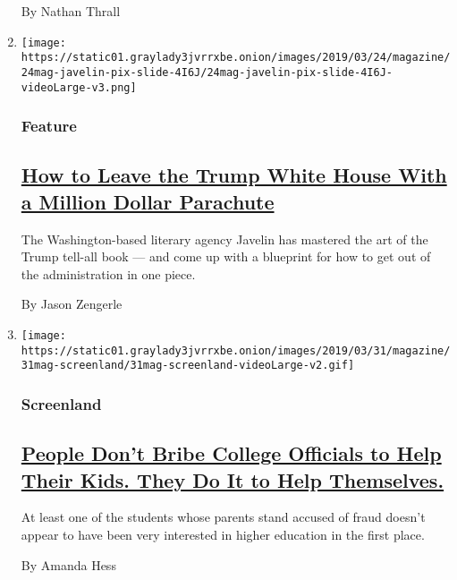 \begin{enumerate}
  By Nathan Thrall
\item
  \texttt{[image: https://static01.graylady3jvrrxbe.onion/images/2019/03/24/magazine/24mag-javelin-pix-slide-4I6J/24mag-javelin-pix-slide-4I6J-videoLarge-v3.png]}

  \hypertarget{feature-2}{%
  \subsubsection{Feature}\label{feature-2}}

  \hypertarget{how-to-leave-the-trump-white-house-with-a-million-dollar-parachute}{%
  \subsection{\texorpdfstring{\href{/2019/03/26/magazine/trump-book-javelin.html}{How
  to Leave the Trump White House With a Million Dollar
  Parachute}}{How to Leave the Trump White House With a Million Dollar Parachute}}\label{how-to-leave-the-trump-white-house-with-a-million-dollar-parachute}}

  The Washington-based literary agency Javelin has mastered the art of
  the Trump tell-all book --- and come up with a blueprint for how to
  get out of the administration in one piece.

  By Jason Zengerle
\item
  \texttt{[image: https://static01.graylady3jvrrxbe.onion/images/2019/03/31/magazine/31mag-screenland/31mag-screenland-videoLarge-v2.gif]}

  \hypertarget{screenland}{%
  \subsubsection{Screenland}\label{screenland}}

  \hypertarget{people-dont-bribe-college-officials-to-help-their-kids-they-do-it-to-help-themselves}{%
  \subsection{\texorpdfstring{\href{/2019/03/27/magazine/people-dont-bribe-college-officials-to-help-their-kids-they-do-it-to-help-themselves.html}{People
  Don't Bribe College Officials to Help Their Kids. They Do It to Help
  Themselves.}}{People Don't Bribe College Officials to Help Their Kids. They Do It to Help Themselves.}}\label{people-dont-bribe-college-officials-to-help-their-kids-they-do-it-to-help-themselves}}

  At least one of the students whose parents stand accused of fraud
  doesn't appear to have been very interested in higher education in the
  first place.

  By Amanda Hess
\end{enumerate}

